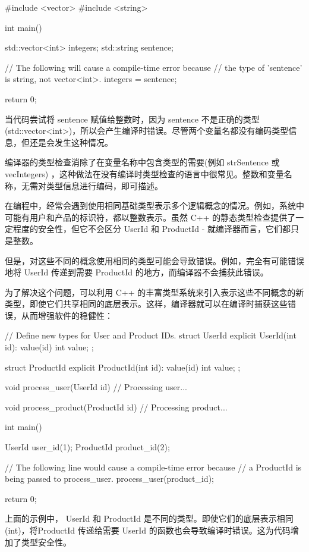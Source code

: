 \begin{cpp}
#include <vector>
#include <string>

int main() {
    std::vector<int> integers;
    std::string sentence;

    // The following will cause a compile-time error because
    // the type of 'sentence' is string, not vector<int>.
    integers = sentence;

    return 0;
}
\end{cpp}

当代码尝试将 sentence 赋值给整数时，因为 sentence 不是正确的类型 (std::vector<int>)，所以会产生编译时错误。尽管两个变量名都没有编码类型信息，但还是会发生这种情况。

编译器的类型检查消除了在变量名称中包含类型的需要(例如 strSentence 或 vecIntegers) ，这种做法在没有编译时类型检查的语言中很常见。整数和变量名称，无需对类型信息进行编码，即可描述。

在编程中，经常会遇到使用相同基础类型表示多个逻辑概念的情况。例如，系统中可能有用户和产品的标识符，都以整数表示。虽然 C++ 的静态类型检查提供了一定程度的安全性，但它不会区分 UserId 和 ProductId - 就编译器而言，它们都只是整数。

但是，对这些不同的概念使用相同的类型可能会导致错误。例如，完全有可能错误地将 UserId 传递到需要 ProductId 的地方，而编译器不会捕获此错误。

为了解决这个问题，可以利用 C++ 的丰富类型系统来引入表示这些不同概念的新类型，即使它们共享相同的底层表示。这样，编译器就可以在编译时捕获这些错误，从而增强软件的稳健性：

\begin{cpp}
// Define new types for User and Product IDs.
struct UserId {
    explicit UserId(int id): value(id) {}
    int value;
};

struct ProductId {
    explicit ProductId(int id): value(id) {}
    int value;
};

void process_user(UserId id) {
    // Processing user...
}

void process_product(ProductId id) {
    // Processing product...
}

int main() {
    UserId user_id(1);
    ProductId product_id(2);

    // The following line would cause a compile-time error because
    // a ProductId is being passed to process_user.
    process_user(product_id);

    return 0;
}
\end{cpp}

上面的示例中， UserId 和 ProductId 是不同的类型。即使它们的底层表示相同(int)，将ProductId 传递给需要 UserId 的函数也会导致编译时错误。这为代码增加了类型安全性。

